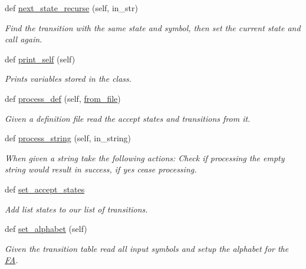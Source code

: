 \begin{DoxyCompactItemize}
def \mbox{\hyperlink{classfinite__automaton_1_1_f_a_aec2031a3c5b38240f7f7c5e702a81285}{next\+\_\+state\+\_\+recurse}} (self, in\+\_\+str)
\begin{DoxyCompactList}\small\item\em Find the transition with the same state and symbol, then set the current state and call again. \end{DoxyCompactList}\item 
def \mbox{\hyperlink{classfinite__automaton_1_1_f_a_a7b8ba69ad507d4215937f17424a169b5}{print\+\_\+self}} (self)
\begin{DoxyCompactList}\small\item\em Prints variables stored in the class. \end{DoxyCompactList}\item 
def \mbox{\hyperlink{classfinite__automaton_1_1_f_a_a69da294e9158ca41fff39c1c3152b96f}{process\+\_\+def}} (self, \mbox{\hyperlink{classfinite__automaton_1_1_f_a_a584285fe507e7e46c15601255510836e}{from\+\_\+file}})
\begin{DoxyCompactList}\small\item\em Given a definition file read the accept states and transitions from it. \end{DoxyCompactList}\item 
def \mbox{\hyperlink{classfinite__automaton_1_1_f_a_aa7686e478502243c2b0deb903cfb0a08}{process\+\_\+string}} (self, in\+\_\+string)
\begin{DoxyCompactList}\small\item\em When given a string take the following actions\+: Check if processing the empty string would result in success, if yes cease processing. \end{DoxyCompactList}\item 
def \mbox{\hyperlink{classfinite__automaton_1_1_f_a_af894ad4821bc51313d309d4cabe720ee}{set\+\_\+accept\+\_\+states}}
\begin{DoxyCompactList}\small\item\em Add list states to our list of transitions. \end{DoxyCompactList}\item 
def \mbox{\hyperlink{classfinite__automaton_1_1_f_a_a99364809624a50f61fb859dd8c87813a}{set\+\_\+alphabet}} (self)
\begin{DoxyCompactList}\small\item\em Given the transition table read all input symbols and setup the alphabet for the \mbox{\hyperlink{classfinite__automaton_1_1_f_a}{FA}}. \end{DoxyCompactList}\item 

\end{DoxyCompactItemize}
